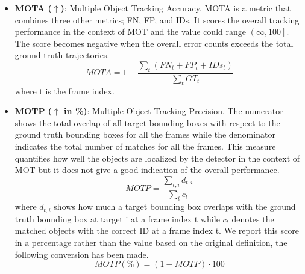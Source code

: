 \begin{itemize}
\item \textbf{MOTA ($\uparrow$)}: Multiple Object Tracking Accuracy. MOTA is a metric that combines three other metrics; FN, FP, and IDs. It scores the overall tracking performance in the context of MOT and the value could range $\left( \infty, 100 \right]$. The score becomes negative when the overall error counts exceeds the total ground truth trajectories.
\begin{equation}
MOTA = 1 - \frac{\sum_{t} (FN_{t} + FP_{t} + IDs_{t})}{\sum_{t}GT_{t}}
\end{equation}
where t is the frame index.

\item \textbf{MOTP ($\uparrow$ in \%)}: Multiple Object Tracking Precision. The numerator shows the total overlap of all target bounding boxes with respect to the ground truth bounding boxes for all the frames while the denominator indicates the total number of matches for all the frames. This measure quantifies how well the objects are localized by the detector in the context of MOT but it does not give a good indication of the overall performance.
\begin{equation} 
MOTP = \frac{\sum_{t,i} d_{t,i}}{\sum_{t}c_{t}}
\end{equation}
where $d_{t,i}$ shows how much a target bounding box overlaps with the ground truth bounding box at target i at a frame index t while $c_{t}$ denotes the matched objects with the correct ID at a frame index t. We report this score in a percentage rather than the value based on the original definition, the following conversion has been made.
\begin{equation} 
MOTP (\%) = (1 - MOTP) \cdot 100
\end{equation}

\end{itemize}

